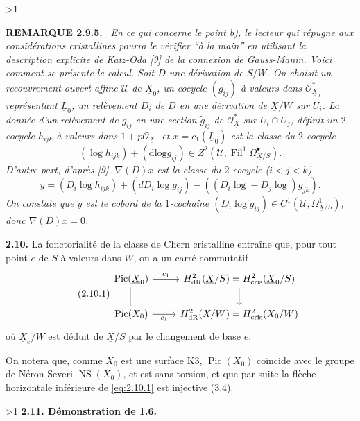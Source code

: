 \documentclass[10pt]{article}
\makeatletter
\DeclareMathOperator{\Pic}{Pic}
\DeclareMathOperator{\Fil}{Fil}
\DeclareMathOperator{\NS}{NS}
\newcommand{\cris}{\mathrm{cris}}
\newcommand{\dlog}{\mathrm{dlog}}
\newcommand{\UX}{\underline{X}}
\newcommand{\UL}{\underline{L}}
\newcommand{\sourceanchor}[2]{\begingroup\def\@currentlabel{#2}\label{#1}\endgroup}
\newenvironment{sourcestatement}[3]{\par\smallskip\noindent\textbf{#1 #2.}\sourceanchor{#3}{#2}\ \itshape}{\par\normalfont\smallskip}
\newcommand{\DPage}[2]{\ifnum#1>1\clearpage\fi\setcounter{page}{#2}}
\makeatother
\begin{document}
\DPage{17}{74}
\begin{sourcestatement}{REMARQUE}{2.9.5}{rem:2.9.5}
En ce qui concerne le point b), le lecteur qui répugne aux considérations cristallines pourra le vérifier ``à la main'' en utilisant la description explicite de Katz-Oda [9] de la connexion de Gauss-Manin. Voici comment se présente le calcul. Soit $D$ une dérivation de $S/W$. On choisit un recouvrement ouvert affine $\mathcal{U}$ de $\UX_0$, un cocycle $(g_{ij})$ à valeurs dans $\mathcal{O}_{\UX_0}^*$ représentant $\UL_0$, un relèvement $D_i$ de $D$ en une dérivation de $\UX/W$ sur $U_i$. La donnée d'un relèvement de $g_{ij}$ en une section $\tilde{g}_{ij}$ de $\mathcal{O}_{\UX}^*$ sur $U_i \cap U_j$, définit un $2$-cocycle $h_{ijk}$ à valeurs dans $1 + p\mathcal{O}_{\UX}$, et $x = c_1(\UL_0)$ est la classe du $2$-cocycle
\[
(\log h_{ijk}) + (\dlog g_{ij}) \in Z^2(\mathcal{U}, \Fil^1 \Omega^{\bullet}_{\UX/S}).
\]
D'autre part, d'après [9], $\nabla(D)x$ est la classe du $2$-cocycle ($i < j < k$)
\[
y = (D_i \log h_{ijk}) + (d D_i \log g_{ij}) - ((D_i \log - D_j \log) g_{jk}).
\]
On constate que $y$ est le cobord de la $1$-cochaîne $(D_i \log \tilde{g}_{ij}) \in C^1(\mathcal{U}, \Omega^1_{\UX/S})$, donc $\nabla(D)x = 0$.
\end{sourcestatement}

\noindent\textbf{2.10.}
La fonctorialité de la classe de Chern cristalline entraîne que, pour tout point $e$ de $S$ à valeurs dans $W$, on a un carré commutatif
\begin{equation}\tag{2.10.1}\label{eq:2.10.1}
\begin{tikzcd}
\Pic(\UX_0) \arrow[r, "c_1"] \arrow[d, equal] & H^2_{\mathrm{dR}}(\UX/S) = H^2_{\cris}(\UX_0/S) \arrow[d] \\
\Pic(X_0) \arrow[r, "c_1"'] & H^2_{\mathrm{dR}}(X/W) = H^2_{\cris}(X_0/W)
\end{tikzcd}
\end{equation}
où $\UX_e/W$ est déduit de $\UX/S$ par le changement de base $e$.

On notera que, comme $X_0$ est une surface K3, $\Pic(X_0)$ coïncide avec le groupe de Néron-Severi $\NS(X_0)$, et est sans torsion, et que par suite la flèche horizontale inférieure de \eqref{eq:2.10.1} est injective (3.4).

\DPage{18}{75}
\noindent\textbf{2.11. Démonstration de 1.6.}\sourceanchor{subsec:2.11}{2.11}
\end{document}
